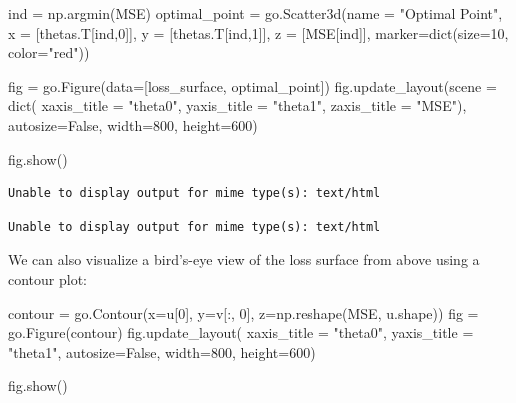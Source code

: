 \documentclass[
  letterpaper,
  DIV=11,
  numbers=noendperiod]{scrreprt}
\newenvironment{Shaded}{\begin{snugshade}}{\end{snugshade}}
\newcommand{\BuiltInTok}[1]{\textcolor[rgb]{0.00,0.23,0.31}{#1}}
\newcommand{\DecValTok}[1]{\textcolor[rgb]{0.68,0.00,0.00}{#1}}
\newcommand{\NormalTok}[1]{\textcolor[rgb]{0.00,0.23,0.31}{#1}}
\newcommand{\OperatorTok}[1]{\textcolor[rgb]{0.37,0.37,0.37}{#1}}
\newcommand{\StringTok}[1]{\textcolor[rgb]{0.13,0.47,0.30}{#1}}
\newcommand{\VariableTok}[1]{\textcolor[rgb]{0.07,0.07,0.07}{#1}}
\begin{document}
\begin{Shaded}
\begin{Highlighting}[]
\NormalTok{ind }\OperatorTok{=}\NormalTok{ np.argmin(MSE)}
\NormalTok{optimal\_point }\OperatorTok{=}\NormalTok{ go.Scatter3d(name }\OperatorTok{=} \StringTok{"Optimal Point"}\NormalTok{,}
\NormalTok{    x }\OperatorTok{=}\NormalTok{ [thetas.T[ind,}\DecValTok{0}\NormalTok{]], y }\OperatorTok{=}\NormalTok{ [thetas.T[ind,}\DecValTok{1}\NormalTok{]], }
\NormalTok{    z }\OperatorTok{=}\NormalTok{ [MSE[ind]],}
\NormalTok{    marker}\OperatorTok{=}\BuiltInTok{dict}\NormalTok{(size}\OperatorTok{=}\DecValTok{10}\NormalTok{, color}\OperatorTok{=}\StringTok{"red"}\NormalTok{))}

\NormalTok{fig }\OperatorTok{=}\NormalTok{ go.Figure(data}\OperatorTok{=}\NormalTok{[loss\_surface, optimal\_point])}
\NormalTok{fig.update\_layout(scene }\OperatorTok{=} \BuiltInTok{dict}\NormalTok{(}
\NormalTok{    xaxis\_title }\OperatorTok{=} \StringTok{"theta0"}\NormalTok{,}
\NormalTok{    yaxis\_title }\OperatorTok{=} \StringTok{"theta1"}\NormalTok{,}
\NormalTok{    zaxis\_title }\OperatorTok{=} \StringTok{"MSE"}\NormalTok{), autosize}\OperatorTok{=}\VariableTok{False}\NormalTok{, width}\OperatorTok{=}\DecValTok{800}\NormalTok{, height}\OperatorTok{=}\DecValTok{600}\NormalTok{)}

\NormalTok{fig.show()}
\end{Highlighting}
\end{Shaded}

\begin{verbatim}
Unable to display output for mime type(s): text/html
\end{verbatim}

\begin{verbatim}
Unable to display output for mime type(s): text/html
\end{verbatim}

We can also visualize a bird's-eye view of the loss surface from above
using a contour plot:

\begin{Shaded}
\begin{Highlighting}[]
\NormalTok{contour }\OperatorTok{=}\NormalTok{ go.Contour(x}\OperatorTok{=}\NormalTok{u[}\DecValTok{0}\NormalTok{], y}\OperatorTok{=}\NormalTok{v[:, }\DecValTok{0}\NormalTok{], z}\OperatorTok{=}\NormalTok{np.reshape(MSE, u.shape))}
\NormalTok{fig }\OperatorTok{=}\NormalTok{ go.Figure(contour)}
\NormalTok{fig.update\_layout(}
\NormalTok{    xaxis\_title }\OperatorTok{=} \StringTok{"theta0"}\NormalTok{,}
\NormalTok{    yaxis\_title }\OperatorTok{=} \StringTok{"theta1"}\NormalTok{, autosize}\OperatorTok{=}\VariableTok{False}\NormalTok{, width}\OperatorTok{=}\DecValTok{800}\NormalTok{, height}\OperatorTok{=}\DecValTok{600}\NormalTok{)}

\NormalTok{fig.show()}
\end{Highlighting}
\end{Shaded}
\end{document}

